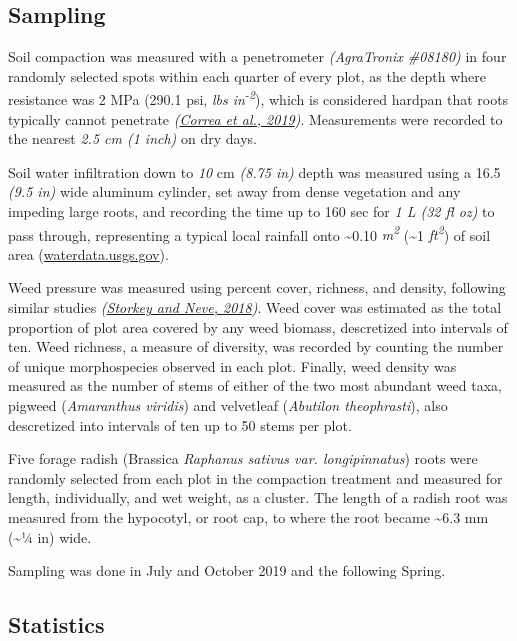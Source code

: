 \documentclass[
  12pt,
]{article}
\begin{document}
\hypertarget{sampling}{%
\subsection{Sampling}\label{sampling}}

Soil compaction was measured with a penetrometer \emph{(AgraTronix \#08180)} in four randomly selected spots within each quarter of every plot, as the depth where resistance was 2 MPa (290.1 psi, \emph{lbs in\textsuperscript{-2}}), which is considered hardpan that roots typically cannot penetrate \emph{(\protect\hyperlink{ref-correa19}{Correa et al., 2019})}.
Measurements were recorded to the nearest \emph{2.5 cm (1 inch)} on dry days.

Soil water infiltration down to \emph{10}
cm \emph{(8.75 in)} depth was measured using a 16.5 \emph{(9.5 in)} wide aluminum cylinder, set away from dense vegetation and any impeding large roots, and recording the time up to 160 sec for \emph{1 L (32 fl oz)} to pass through, representing a typical local rainfall onto \textasciitilde0.10 \emph{m\textsuperscript{2}} (\textasciitilde1 \emph{ft\textsuperscript{2}}) of soil area (\url{waterdata.usgs.gov}).

Weed pressure was measured using percent cover, richness, and density, following similar studies \emph{(\protect\hyperlink{ref-storkey18}{Storkey and Neve, 2018})}.
Weed cover was estimated as the total proportion of plot area covered by any weed biomass, descretized into intervals of ten.
Weed richness, a measure of diversity, was recorded by counting the number of unique morphospecies observed in each plot.
Finally, weed density was measured as the number of stems of either of the two most abundant weed taxa, pigweed (\emph{Amaranthus viridis}) and velvetleaf (\emph{Abutilon theophrasti}), also descretized into intervals of ten up to 50 stems per plot.

Five forage radish (Brassica \emph{Raphanus sativus var. longipinnatus}) roots were randomly selected from each plot in the compaction treatment and measured for length, individually, and wet weight, as a cluster.
The length of a radish root was measured from the hypocotyl, or root cap, to where the root became \textasciitilde6.3 mm (\textasciitilde1⁄4 in) wide.

Sampling was done in July and October 2019 and the following Spring.

\hypertarget{statistics}{%
\subsection{Statistics}\label{statistics}}
\end{document}
